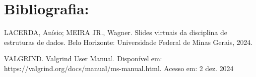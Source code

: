 \documentclass[11pt]{article}
\begin{document}

\section*{Bibliografia:}

    \par LACERDA, Anísio; MEIRA JR., Wagner. Slides virtuais da disciplina de estruturas de dados. Belo Horizonte: Universidade Federal de Minas Gerais, 2024.
    
    \par VALGRIND. Valgrind User Manual. Disponível em:
https://valgrind.org/docs/manual/ms-manual.html. Acesso em: 2 dez. 2024

\end{document}
